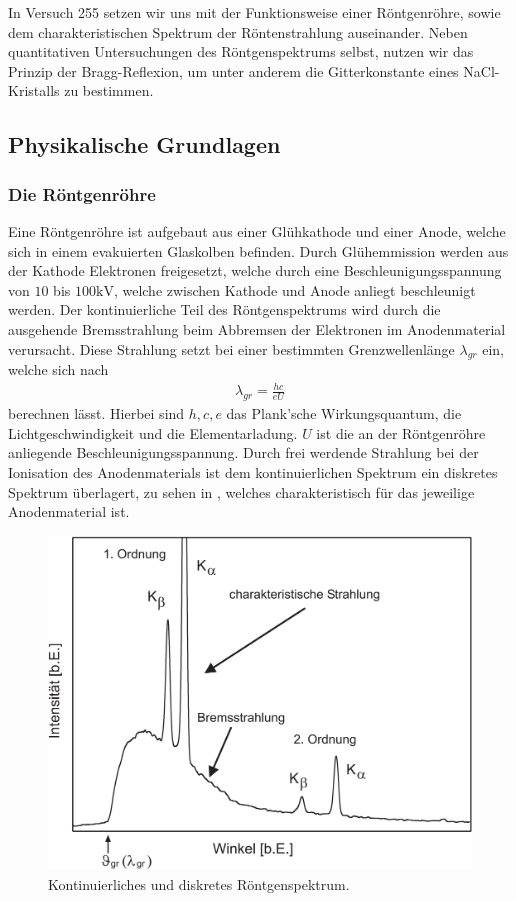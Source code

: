 In Versuch 255 setzen wir uns mit der Funktionsweise einer Röntgenröhre, sowie dem charakteristischen Spektrum der Röntenstrahlung auseinander. Neben quantitativen Untersuchungen des Röntgenspektrums selbst, nutzen wir das Prinzip der Bragg-Reflexion, um unter anderem die Gitterkonstante eines NaCl-Kristalls zu bestimmen.

\subsection{Physikalische Grundlagen}

\subsubsection*{Die Röntgenröhre}
Eine Röntgenröhre ist aufgebaut aus einer Glühkathode und einer Anode, welche sich in einem evakuierten Glaskolben befinden. Durch Glühemmission werden aus der Kathode Elektronen freigesetzt, welche durch eine Beschleunigungsspannung von $10$ bis $100\si{\kilo\volt}$, welche zwischen Kathode und Anode anliegt beschleunigt werden. Der kontinuierliche Teil des Röntgenspektrums wird durch die ausgehende Bremsstrahlung beim Abbremsen der Elektronen im Anodenmaterial verursacht. Diese Strahlung setzt bei einer bestimmten Grenzwellenlänge $\lambda_{gr}$ ein, welche sich nach
\begin{align}
  \lambda_{gr} = \frac{hc}{eU}\label{eq:grenzfreq}
\end{align}
berechnen lässt. Hierbei sind $h,c,e$ das Plank'sche Wirkungsquantum, die Lichtgeschwindigkeit und die Elementarladung. $U$ ist die an der Röntgenröhre anliegende Beschleunigungsspannung. Durch frei werdende Strahlung bei der Ionisation des Anodenmaterials ist dem kontinuierlichen Spektrum ein diskretes Spektrum überlagert, zu sehen in , welches charakteristisch für das jeweilige Anodenmaterial ist. 

\begin{figure}[H]
  \centering
  \includegraphics[width=.75\textwidth]{files/roentgenspektrum.png}
  \caption{Kontinuierliches und diskretes Röntgenspektrum.}
  \label{fig:roentgenspektrum}
\end{figure}

